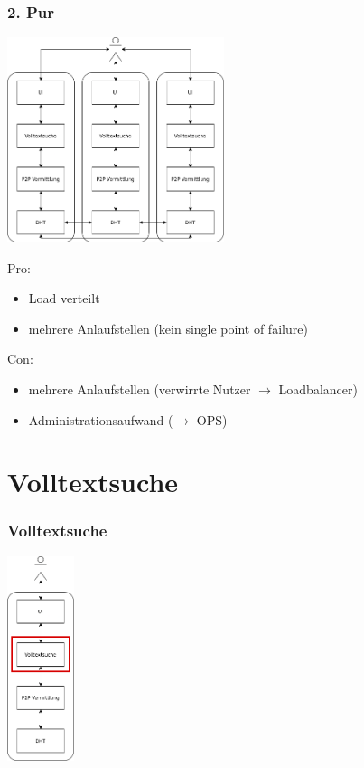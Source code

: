 \documentclass{beamer}
\begin{document}
\begin{frame}[allowframebreaks]
  \frametitle{2. Pur}

  \begin{center}
    \includegraphics[height=6cm]{Gleichberechtigt}
  \end{center}

  \break
  Pro:
  \begin{itemize}
    \item Load verteilt
    \item mehrere Anlaufstellen (kein single point of failure)
  \end{itemize}

  Con:
  \begin{itemize}
    \item mehrere Anlaufstellen (verwirrte Nutzer $\rightarrow$ Loadbalancer)
    \item Administrationsaufwand ($\rightarrow$ OPS)
  \end{itemize}
\end{frame}

\section{Volltextsuche}
\begin{frame}
  \frametitle{Volltextsuche}

  \begin{center}
    \includegraphics[height=6cm]{Schichten-alt-volltext}
  \end{center}
\end{frame}
\end{document}
